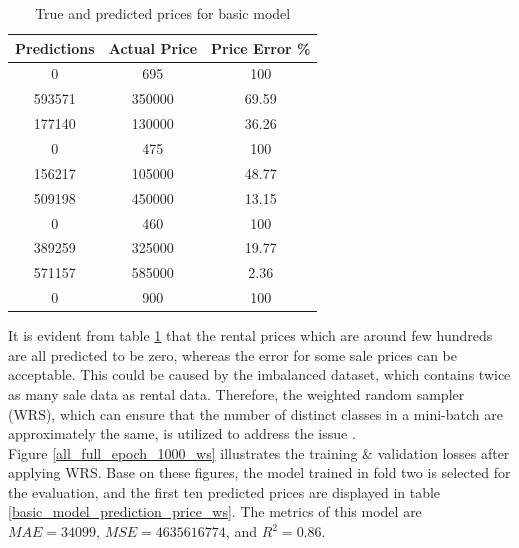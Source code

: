 \documentclass[12pt,twoside]{report}
\begin{document}
\begin{table}[!htbp]
	\centering
	\caption{ True and predicted prices for basic model}
	\label{basic_model_prediction_price}
	\begin{tabular}{| c | c | c |}
		\hline
		Predictions & Actual Price & Price Error \% \\
		\hline
		0 & 695 & 100 \\
		\hline
		593571 & 350000 & 69.59 \\
		\hline
		177140 & 130000 & 36.26 \\
		\hline
		0 & 475 & 100 \\
		\hline
		156217 & 105000 & 48.77 \\
		\hline
		509198 & 450000 & 13.15 \\
		\hline
		0 & 460 & 100 \\ 
		\hline
		389259 & 325000 & 19.77 \\
		\hline
		571157 & 585000 & 2.36 \\
		\hline
		0 & 900 & 100 \\
		\hline
	\end{tabular}
\end{table}

 It is evident from table \ref{basic_model_prediction_price} that the rental prices which are around few hundreds are all predicted to be zero, whereas the error for some sale prices can be acceptable. This could be caused by the imbalanced dataset, which contains twice as many sale data as rental data. Therefore, the weighted random sampler (WRS), which can ensure that the number of distinct classes in a mini-batch are approximately the same, is utilized to address the issue .
 \\
 
Figure \ref{all_full_epoch_1000_ws} illustrates the training \& validation losses after applying WRS. Base on these figures, the model trained in fold two is selected for the evaluation, and the first ten predicted prices are displayed in table \ref{basic_model_prediction_price_ws}. The metrics of this model are $MAE = 34099$, $MSE = 4635616774$, and $R^2 = 0.86$. 
\end{document}
